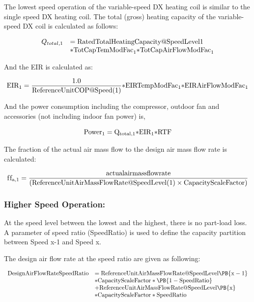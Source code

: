 The lowest speed operation of the variable-speed DX heating coil is similar to the single speed DX heating coil. The total (gross) heating capacity of the variable-speed DX coil is calculated as follows:

\begin{equation}
  \begin{array}{rl}
    Q_{total,1} &= \rm{RatedTotalHeatingCapacity @ SpeedLevel 1} \\
                &* \rm{TotCapTemModFac}_1 \rm{* TotCapAirFlowModFac}_1
  \end{array}
\end{equation}

And the EIR is calculated as:

\begin{equation}
{\rm{EI}}{{\rm{R}}_1} = \frac{{1.0}}{{{\rm{ReferenceUnitCOP}}@{\rm{Speed}}(1)}}{\rm{*EIRTempModFa}}{{\rm{c}}_1}{\rm{*EIRAirFlowModFa}}{{\rm{c}}_1}
\end{equation}

And the power consumption including the compressor, outdoor fan and accessories (not including indoor fan power) is,

\begin{equation}
{\rm{Powe}}{{\rm{r}}_1} = {{\rm{Q}}_{{\rm{total}},1}}{\rm{*EI}}{{\rm{R}}_1}{\rm{*RTF}}
\end{equation}

The fraction of the actual air mass flow to the design air mass flow rate is calculated:

\begin{equation}
{\rm{f}}{{\rm{f}}_{{\rm{a}},1}} = \frac{{{\rm{actualairmassflowrate}}}}{{({\rm{ReferenceUnitAirMassFlowRate}}@{\rm{SpeedLevel}}(1) \times {\rm{CapacityScaleFactor}})}}{\rm{}}
\end{equation}

\subsubsection{Higher Speed Operation:}\label{higher-speed-operation-1-001}

At the speed level between the lowest and the highest, there is no part-load loss. A parameter of speed ratio (SpeedRatio) is used to define the capacity partition between Speed x-1 and Speed x.

The design air flow rate at the speed ratio are given as following:

\begin{equation}
  \begin{array}{rl}
    \rm{DesignAirFlowRateSpeedRatio} &= \rm{ReferenceUnitAirMassFlowRate @ SpeedLevel} \PB{x-1} \\
                                     &* \rm{CapacityScaleFactor} * \PB{1 - SpeedRatio} \\
                                     &+ \rm{ReferenceUnitAirMassFlowRate @ SpeedLevel} \PB{x} \\
                                     &* \rm{CapacityScaleFactor*SpeedRatio}
  \end{array}
\end{equation}


